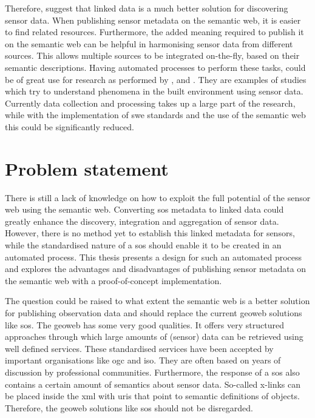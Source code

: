 Therefore, \citeauthor{SSW:Atkinson} suggest that linked data is a much better solution for discovering sensor data. When publishing sensor metadata on the semantic web, it is easier to find related resources. Furthermore, the added meaning required to publish it on the semantic web can be helpful in harmonising sensor data from different sources. This allows multiple sources to be integrated on-the-fly, based on their semantic descriptions. Having automated processes to perform these tasks, could be of great use for research as performed by \cite{UC:vanderHoeven}, \cite{UC:Hotterdam} and \cite{UC:Theunisse}. They are examples of studies which try to understand phenomena in the built environment using sensor data. Currently data collection and processing takes up a large part of the research, while with the implementation of \ac{swe} standards and the use of the semantic web this could be significantly reduced.  


\section{Problem statement}
There is still a lack of knowledge on how to exploit the full potential of the sensor web using the semantic web. Converting \ac{sos} metadata to linked data could greatly enhance the discovery, integration and aggregation of sensor data. However, there is no method yet to establish this linked metadata for sensors, while the standardised nature of a \ac{sos} should enable it to be created in an automated process. This thesis presents a design for such an automated process and explores the advantages and disadvantages of publishing sensor metadata on the semantic web with a proof-of-concept implementation. 

The question could be raised to what extent the semantic web is a better solution for publishing observation data and should replace the current geoweb solutions like \ac{sos}. The geoweb has some very good qualities. It offers very structured approaches through which large amounts of (sensor) data can be retrieved using well defined services. These standardised services have been accepted by important organisations like \ac{ogc} and \ac{iso}. They are often based on years of discussion by professional communities. Furthermore, the response of a \ac{sos} also contains a certain amount of semantics about sensor data. So-called x-links can be placed inside the \ac{xml} with \ac{uri}s that point to semantic definitions of objects. Therefore, the geoweb solutions like \ac{sos} should not be disregarded.

